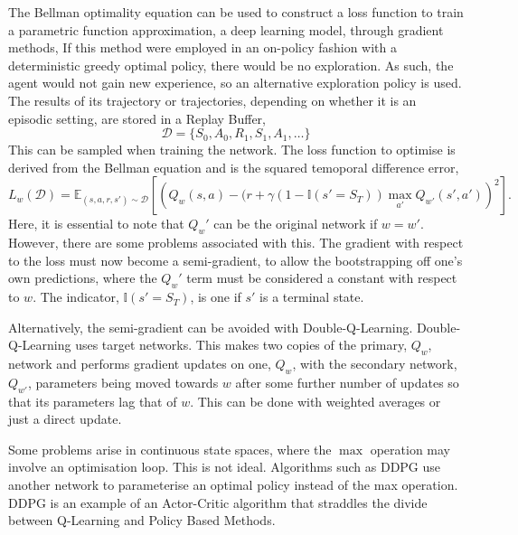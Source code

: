 The Bellman optimality equation can be used to construct a loss function to train a parametric function approximation, a deep learning model, through gradient methods, If this method were employed in an on-policy fashion with a deterministic greedy optimal policy, there would be no exploration. As such, the agent would not gain new experience, so an alternative exploration policy is used. The results of its trajectory or trajectories, depending on whether it is an episodic setting, are stored in a Replay Buffer,
\begin{equation}
	\mathcal{D} = \{S_0, A_0, R_1, S_1, A_1, \ldots \}
\end{equation}
This can be sampled when training the network. The loss function to optimise is derived from the Bellman equation and is the squared temoporal difference error\cite{sutton2018reinforcement},
\begin{equation}
	L_{w}(\mathcal{D}) = \mathbb{E}_{(s,a,r,s') \sim \mathcal{D}}\left[\left(Q_w(s,a) -(r + \gamma(1-\mathbb{I}(s'= S_{T}))\max_{a'}Q_{w'}(s', a')\right)^2\right].
\end{equation}
Here, it is essential to note that $Q_w'$ can be the original network if $w = w'$. However, there are some problems associated with this. The gradient with respect to the loss must now become a semi-gradient, to allow the bootstrapping off one's own predictions, where the $Q_w'$ term must be considered a constant with respect to $w$. The indicator, $\mathbb{I}(s' = S_T)$,  is one if $s'$ is a terminal state.

Alternatively, the semi-gradient can be avoided with Double-Q-Learning. Double-Q-Learning uses target networks\cite{van2016deep}. This makes two copies of the primary, $Q_w$, network and performs gradient updates on one, $Q_w$, with the secondary network, $Q_{w'}$, parameters being moved towards $w$ after some further number of updates so that its parameters lag that of $w$. This can be done with weighted averages or just a direct update.

Some problems arise in continuous state spaces, where the $\max$ operation may involve an optimisation loop. This is not ideal. Algorithms such as DDPG\cite{lillicrap2015continuous} use another network to parameterise an optimal policy instead of the max operation. DDPG is an example of an Actor-Critic algorithm that straddles the divide between Q-Learning and Policy Based Methods.


